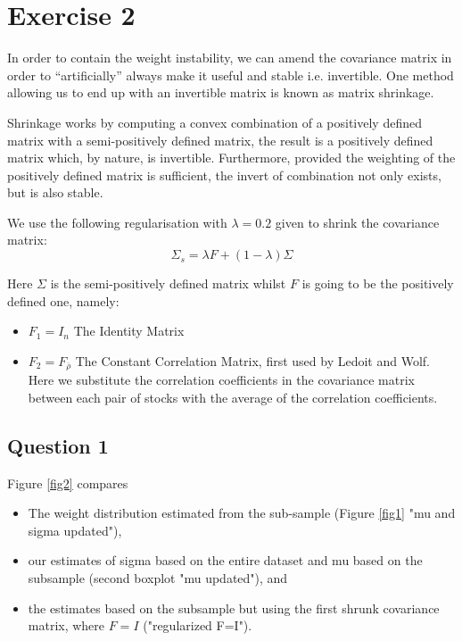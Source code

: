 \chapter*{Exercise 2}

In order to contain the weight instability, we can amend the covariance matrix in order to “artificially” always make it useful and stable i.e. invertible. One method allowing us to end up with an invertible matrix is known as matrix shrinkage. \par\smallskip
Shrinkage works by computing a convex combination of a positively defined matrix with a semi-positively defined matrix, the result is a positively defined matrix which, by nature, is invertible. Furthermore, provided the weighting of the positively defined matrix is sufficient, the invert of combination not only exists, but is also stable. \par\smallskip
We use the following regularisation with $\lambda=0.2$ given to shrink the covariance matrix:
\begin{equation*}
\Sigma_s = \lambda F + (1-\lambda)\Sigma
\end{equation*}

Here $\Sigma$ is the semi-positively defined matrix whilst $F$ is going to be the positively defined one, namely:

\begin{itemize}
    \item $F_1=I_n$ The Identity Matrix
    \item $F_2=F_{\overline{\rho}}$ The Constant Correlation Matrix, first used by Ledoit and Wolf. Here we substitute the correlation coefficients in the covariance matrix between each pair of stocks with the average of the correlation coefficients.
\end{itemize}

\section*{Question 1}


Figure \ref{fig2} compares  
\begin{itemize}
\item The weight distribution estimated from the sub-sample (Figure \ref{fig1} "mu and sigma updated"),
\item our estimates of sigma based on the entire dataset and mu based on the subsample (second boxplot "mu updated"), and
\item the estimates based on the subsample but using the first shrunk covariance matrix, where $F=I$ ("regularized F=I"). 
\end{itemize}

